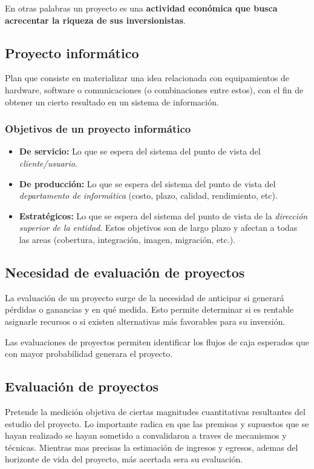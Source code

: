 \documentclass{templateNote}
\begin{document}
En otras palabras un proyecto es una \textbf{actividad económica que busca acrecentar la riqueza de sus inversionistas}.

\subsection{Proyecto informático}
Plan que consiste en materializar una idea relacionada con equipamientos de hardware, software o comunicaciones (o combinaciones entre estos), con el fin de obtener un cierto resultado en un sistema de información.

\subsubsection{Objetivos de un proyecto informático}
\begin{itemize}
    \item \textbf{De servicio:} Lo que se espera del sistema del punto de vista del \textit{cliente/usuario}.
    \item \textbf{De producción:} Lo que se espera del sistema del punto de vista del \textit{departamento de informática} (costo, plazo, calidad, rendimiento, etc).
    \item \textbf{Estratégicos:} Lo que se espera del sistema del punto de vista de la \textit{dirección superior de la entidad}. Estos objetivos son de largo plazo y afectan a todas las areas (cobertura, integración, imagen, migración, etc.).
\end{itemize}

\subsection{Necesidad de evaluación de proyectos}
La evaluación de un proyecto surge de la necesidad de anticipar si generará pérdidas o ganancias y en qué medida. Esto permite determinar si es rentable asignarle recursos o si existen alternativas más favorables para su inversión.

Las evaluaciones de proyectos permiten identificar los flujos de caja esperados que con mayor probabilidad generara el proyecto.

\subsection{Evaluación de proyectos}
Pretende la medición objetiva de ciertas magnitudes cuantitativas resultantes del estudio del proyecto. Lo importante radica en que las premisas y supuestos que se hayan realizado se hayan sometido a convalidaron a traves de mecanismos y técnicas. Mientras mas precisas la estimación de ingresos y egresos, ademas del horizonte de vida del proyecto, más acertada sera su evaluación.
\end{document}
